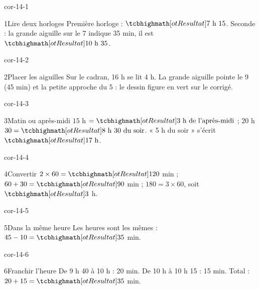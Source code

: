 \clearpage\pagestyle{otMain}\setlength{\otBlocEspacement}{2.5mm}\fontsize{11}{15}\selectfont{}
\begin{blocLivre}{cor-14-1}\begin{corrige}{1}{Lire deux horloges}
Première horloge : $\res{7\ \text h\ 15}$. Seconde : la grande aiguille sur le 7 indique 35 min, il est $\res{10\ \text h\ 35}$.
\label{fig-cor-14-1}
\end{corrige}\end{blocLivre}
\begin{blocLivre}{cor-14-2}\begin{corrige}{2}{Placer les aiguilles}
Sur le cadran, 16 h se lit 4 h. La grande aiguille pointe le 9 (45 min) et la petite approche du 5 : le dessin figure en vert sur le corrigé.
\label{fig-cor-14-2}
\end{corrige}\end{blocLivre}
\begin{blocLivre}{cor-14-3}\begin{corrige}{3}{Matin ou après-midi}
$15$ h $=\res{3\ \text h\ \text{de l’après-midi}}$ ; $20$ h $30=\res{8\ \text h\ 30\ \text{du soir}}$. « 5 h du soir » s’écrit $\res{17\ \text h}$.
\end{corrige}\end{blocLivre}
\begin{blocLivre}{cor-14-4}\begin{corrige}{4}{Convertir}
$2\times60=\res{120}$ min ; $60+30=\res{90}$ min ; $180=3\times60$, soit $\res3$ h.
\end{corrige}\end{blocLivre}
\begin{blocLivre}{cor-14-5}\begin{corrige}{5}{Dans la même heure}
Les heures sont les mêmes : $45-10=\res{35}$ min.
\end{corrige}\end{blocLivre}
\begin{blocLivre}{cor-14-6}\begin{corrige}{6}{Franchir l’heure}
De 9 h 40 à 10 h : 20 min. De 10 h à 10 h 15 : 15 min. Total : $20+15=\res{35}$ min.
\end{corrige}\end{blocLivre}
